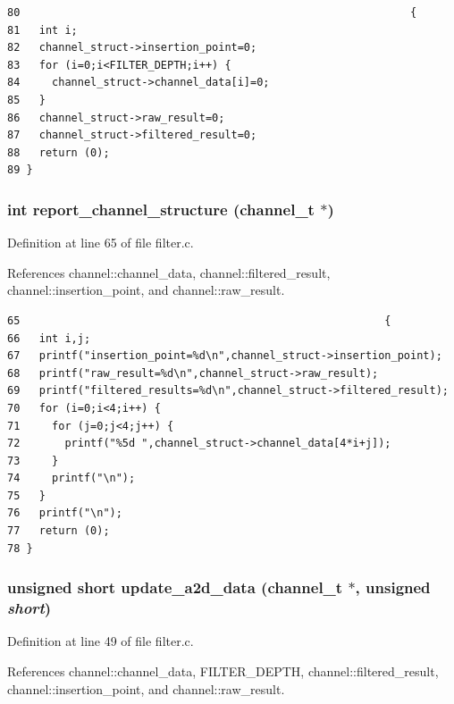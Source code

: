 \footnotesize\begin{verbatim}80                                                             {
81   int i;
82   channel_struct->insertion_point=0;
83   for (i=0;i<FILTER_DEPTH;i++) {
84     channel_struct->channel_data[i]=0;
85   }
86   channel_struct->raw_result=0;
87   channel_struct->filtered_result=0;
88   return (0);
89 }
\end{verbatim}\normalsize 


\subsubsection{\setlength{\rightskip}{0pt plus 5cm}int report\_\-channel\_\-structure ({\bf channel\_\-t} $\ast$)}\label{filter_8h_a4}




Definition at line 65 of file filter.c.

References channel::channel\_\-data, channel::filtered\_\-result, channel::insertion\_\-point, and channel::raw\_\-result.

\footnotesize\begin{verbatim}65                                                         {
66   int i,j;
67   printf("insertion_point=%d\n",channel_struct->insertion_point);
68   printf("raw_result=%d\n",channel_struct->raw_result);
69   printf("filtered_results=%d\n",channel_struct->filtered_result);
70   for (i=0;i<4;i++) {
71     for (j=0;j<4;j++) {
72       printf("%5d ",channel_struct->channel_data[4*i+j]);
73     }
74     printf("\n");
75   }
76   printf("\n");
77   return (0);
78 }
\end{verbatim}\normalsize 


\subsubsection{\setlength{\rightskip}{0pt plus 5cm}unsigned short update\_\-a2d\_\-data ({\bf channel\_\-t} $\ast$, unsigned {\em short})}\label{filter_8h_a3}




Definition at line 49 of file filter.c.

References channel::channel\_\-data, FILTER\_\-DEPTH, channel::filtered\_\-result, channel::insertion\_\-point, and channel::raw\_\-result.

